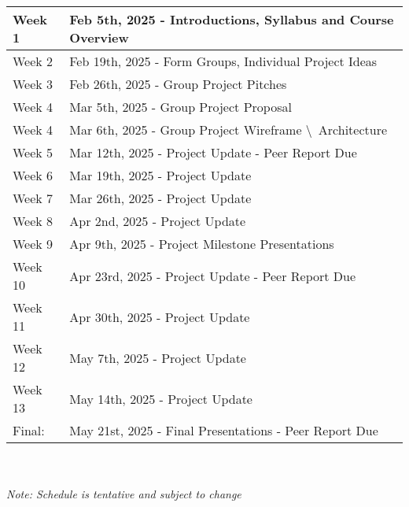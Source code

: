 \renewcommand{\arraystretch}{1.5}



\begin{tabular}{ | l | l |  }
    \hline
    Week 1 & Feb 5th, 2025 - Introductions, Syllabus and Course Overview \\
    \hline
    Week 2 & Feb 19th, 2025 - Form Groups, Individual Project Ideas \\
    \hline
    Week 3 & Feb 26th, 2025 - Group Project Pitches \\ 
    \hline
    Week 4 & Mar 5th, 2025 - Group Project Proposal \\ 
    \hline
    Week 4 & Mar 6th, 2025 - Group Project Wireframe \textbackslash \ Architecture\\ 
    \hline
    Week 5 & Mar 12th, 2025 - Project Update - Peer Report Due \\ 
    \hline
    Week 6 & Mar 19th, 2025 - Project Update \\ 
    \hline
    Week 7 & Mar 26th, 2025 - Project Update \\ 
    \hline
    Week 8 & Apr 2nd, 2025 - Project Update \\ 
    \hline
    Week 9 & Apr 9th, 2025 - Project Milestone Presentations \\ 
    \hline
    Week 10 & Apr 23rd, 2025 - Project Update - Peer Report Due \\ 
    \hline
    Week 11 & Apr 30th, 2025 - Project Update \\ 
    \hline
    Week 12 & May 7th, 2025 - Project Update \\ 
    \hline
    Week 13 & May 14th, 2025 - Project Update \\ 
    \hline
    Final: & May 21st, 2025 - Final Presentations - Peer Report Due \\ 
    \hline
\end{tabular}
\\ \\
\textit{Note: Schedule is tentative and subject to change}
